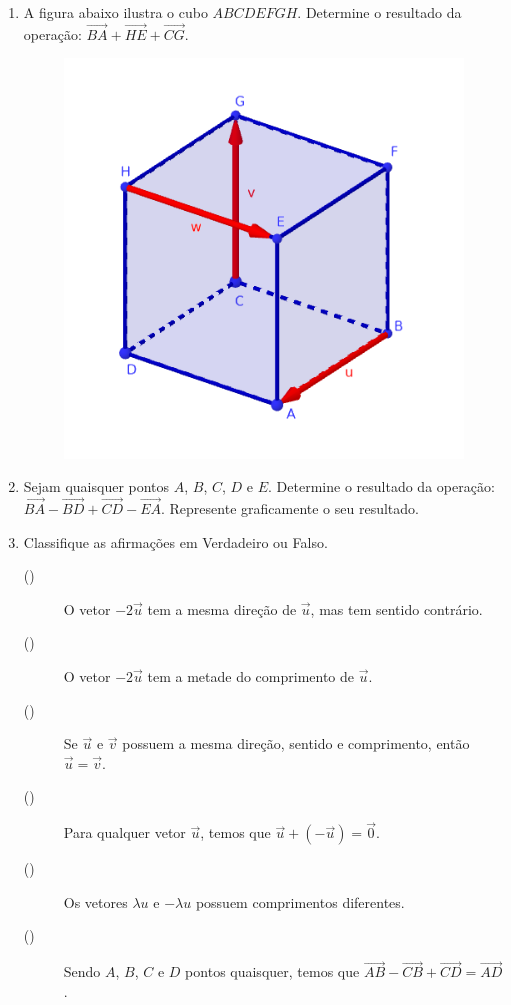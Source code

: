 \documentclass[12pt,a4paper]{article}
\begin{document}
\begin{enumerate}
  \item A figura abaixo ilustra o cubo $ABCDEFGH$. Determine o resultado da operação:
    $\overrightarrow{BA} + \overrightarrow{HE} + \overrightarrow{CG}$.

  \begin{figure}[!htb]
    \centering
    \includegraphics[scale=0.5]{imagem/cubo}
  \end{figure}
 
  \item Sejam quaisquer pontos $A$, $B$, $C$, $D$ e $E$. Determine o resultado da operação:
    $\overrightarrow{BA} - \overrightarrow{BD} + \overrightarrow{CD} - \overrightarrow{EA}$.
    Represente graficamente o seu resultado.
    
  \item Classifique as afirmações em Verdadeiro ou Falso.
  
  \begin{description}
    \item[(\quad)] O vetor $-2\vec{u}$ tem a mesma direção de $\vec{u}$, mas tem 
      sentido contrário.
    \item[(\quad)] O vetor $-2\vec{u}$ tem a metade do comprimento de $\vec{u}$.
    \item[(\quad)] Se $\vec{u}$ e $\vec{v}$ possuem a mesma direção, sentido e
      comprimento, então $\vec{u} = \vec{v}$.
    \item[(\quad)] Para qualquer vetor $\vec{u}$, temos que
      $\vec{u} + (-\vec{u}) = \vec{0}$.
    \item[(\quad)] Os vetores $\lambda u$ e $-\lambda u$ possuem comprimentos
      diferentes.
    \item[(\quad)] Sendo $A$, $B$, $C$ e $D$ pontos quaisquer, temos que 
      $\overrightarrow{AB} - \overrightarrow{CB} + \overrightarrow{CD} = \overrightarrow{AD}$.
  \end{description}


\end{enumerate}
\end{document}
